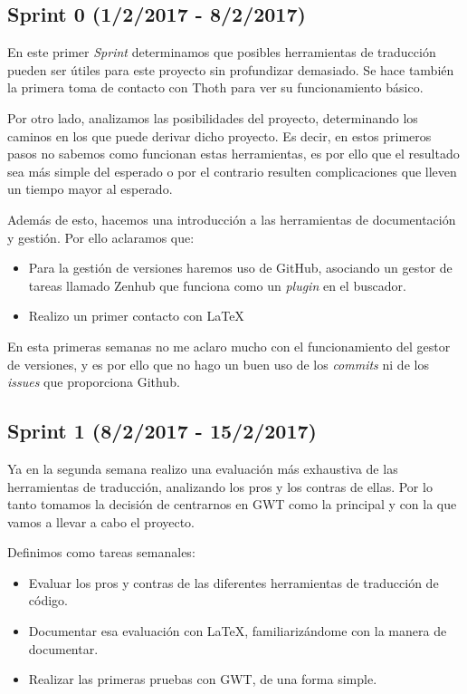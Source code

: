 \subsection{Sprint 0 (1/2/2017 - 8/2/2017)}

En este primer \emph{Sprint} determinamos que posibles herramientas de traducción pueden ser útiles para este proyecto sin profundizar demasiado. Se hace también la primera toma de contacto con Thoth para ver su funcionamiento básico.

Por otro lado, analizamos las posibilidades del proyecto, determinando los caminos en los que puede derivar dicho proyecto. Es decir, en estos primeros pasos no sabemos como funcionan estas herramientas, es por ello que el resultado sea más simple del esperado o por el contrario resulten complicaciones que lleven un tiempo mayor al esperado.

Además de esto, hacemos una introducción a las herramientas de documentación y gestión. Por ello aclaramos que:

\begin{itemize}
\item Para la gestión de versiones haremos uso de GitHub, asociando un gestor de tareas llamado Zenhub que funciona como un \emph{plugin} en el buscador.
\item Realizo un primer contacto con \LaTeX 
\end{itemize}

En esta primeras semanas no me aclaro mucho con el funcionamiento del gestor de versiones, y es por ello que no hago un buen uso de los \emph{commits} ni de los \emph{issues} que proporciona Github.

\subsection{Sprint 1 (8/2/2017 - 15/2/2017)}

Ya en la segunda semana realizo una evaluación más exhaustiva de las herramientas de traducción, analizando los pros y los contras de ellas. Por lo tanto tomamos la decisión de centrarnos en GWT como la principal y con la que vamos a llevar a cabo el proyecto.

Definimos como tareas semanales:

\begin{itemize}
\item Evaluar los pros y contras de las diferentes herramientas de traducción de código.
\item Documentar esa evaluación con \LaTeX , familiarizándome con la manera de documentar.
\item Realizar las primeras pruebas con GWT, de una forma simple.
\end{itemize}

